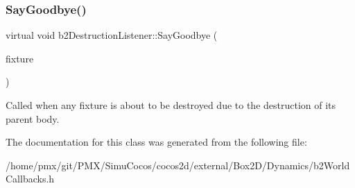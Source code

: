 \subsubsection{\texorpdfstring{Say\+Goodbye()}{SayGoodbye()}\hspace{0.1cm}{\footnotesize\ttfamily [4/4]}}
{\footnotesize\ttfamily virtual void b2\+Destruction\+Listener\+::\+Say\+Goodbye (\begin{DoxyParamCaption}\item[{\hyperlink{classb2Fixture}{b2\+Fixture} $\ast$}]{fixture }\end{DoxyParamCaption})\hspace{0.3cm}{\ttfamily [pure virtual]}}

Called when any fixture is about to be destroyed due to the destruction of its parent body. 

The documentation for this class was generated from the following file\+:\begin{DoxyCompactItemize}
\item 
/home/pmx/git/\+P\+M\+X/\+Simu\+Cocos/cocos2d/external/\+Box2\+D/\+Dynamics/b2\+World\+Callbacks.\+h\end{DoxyCompactItemize}
